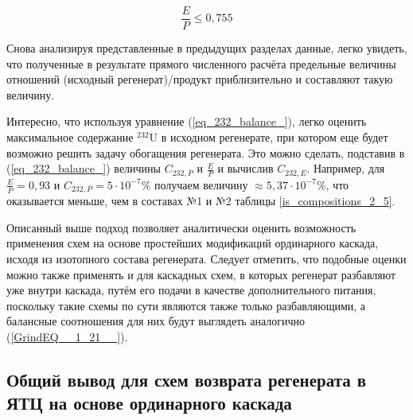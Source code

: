 

\begin{equation}
  \label{eq_232_balance_X_}
    \frac{E}{P} \leq 0,755
\end{equation}


Снова анализируя представленные в предыдущих разделах данные, легко увидеть, что полученные в результате прямого численного расчёта предельные величины отношений (исходный регенерат)/продукт приблизительно и составляют такую величину.

Интересно, что используя уравнение (\ref{eq_232_balance_}), легко оценить максимальное содержание $^{232}$U в исходном регенерате, при котором еще будет возможно решить задачу обогащения регенерата. Это можно сделать, подставив в (\ref{eq_232_balance_}) величины $C_{232,P}$ и $\frac{E}{P}$ и вычислив $C_{232,E}$. Например, для $\frac{E}{P}=0,93$ и $C_{232,P}=5\cdot10^{-7}\%$ получаем величину $\approx 5,37\cdot10^{-7}\%$, что оказывается меньше, чем в составах №1 и №2 таблицы \ref{is_compositions_2_5}.

Описанный выше подход позволяет аналитически оценить возможность применения схем на основе простейших модификаций ординарного каскада, исходя из изотопного состава регенерата. Следует отметить, что подобные оценки можно также применять и для каскадных схем, в которых регенерат разбавляют уже внутри каскада, путём его подачи в качестве дополнительного питания, поскольку такие схемы по сути являются также только разбавляющими, а балансные соотношения для них будут выглядеть аналогично (\ref{GrindEQ__1_21__}).

\subsection{Общий вывод для схем возврата регенерата в ЯТЦ на основе ординарного каскада}\label{sec:ch2/sec2}


